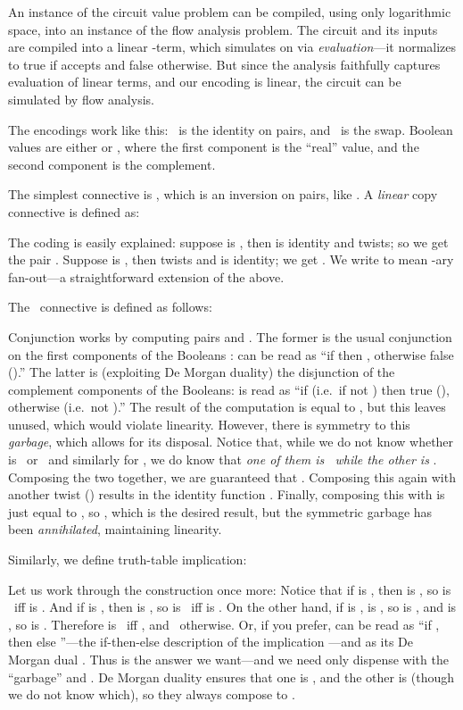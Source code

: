 An instance of the circuit value problem can be compiled, using only
logarithmic space, into an instance of the flow analysis problem.  The
circuit and its inputs are compiled into a linear -term,
which simulates  on  via {\em evaluation}---it normalizes
to true if  accepts  and false otherwise.  But since the
analysis faithfully captures evaluation of linear terms, and our
encoding is linear, the circuit can be simulated by flow analysis.

The encodings work like this: \TT\ is the identity on pairs, and \FF\
is the swap.  Boolean values are either  or
, where the first component is the ``real''
value, and the second component is the complement.  


The simplest connective is \Not, which is an inversion on pairs, like
\FF.  A {\em linear} copy connective is defined as:

The coding is easily explained: suppose  is \True, then  is
identity and  twists; so we get the pair
.  Suppose  is \False, then  twists
and  is identity; we get .  We write
 to mean -ary fan-out---a straightforward extension of the
above.

The \AND\ connective is defined as follows:

Conjunction works by computing pairs  and
.  The former is the usual conjunction on the
first components of the Booleans :  can be read as ``if  then , otherwise false
(\FF).''  The latter is (exploiting De Morgan duality) the disjunction
of the complement components of the Booleans:
 is read as ``if  (i.e.~if not )
then true (\TT), otherwise  (i.e.~not ).''  The result of
the computation is equal to , but this leaves
 unused, which would violate linearity.  However, there is
symmetry to this {\em garbage}, which allows for its disposal.  Notice
that, while we do not know whether  is \TT\ or \FF\ and similarly
for , we do know that {\em one of them is \TT\ while the other is
  \FF}.  Composing the two together, we are guaranteed that .  Composing this again with another twist (\FF) results in
the identity function .  Finally,
composing this with  is just equal to , so ,
which is the desired result, but the symmetric garbage has been {\em
  annihilated}, maintaining linearity.

Similarly, we define truth-table implication:

Let us work through the construction once more: Notice that if 
is \True, then  is \TT, so  is \TT\ iff  is \True.  And
if  is \True, then  is \FF, so  is \FF\ iff  is
\False.  On the other hand, if  is \False,  is \FF, so 
is \TT, and  is \TT, so  is \FF.  Therefore  is \True\ iff , and \False\
otherwise. Or, if you prefer,  can be read
as ``if , then  else ''---the if-then-else description
of the implication  ---and  as its De Morgan dual .  Thus
 is the answer we want---and we need only
dispense with the ``garbage''  and .  De Morgan duality
ensures that one is , and the other is  (though we do not
know which), so they always compose to .


